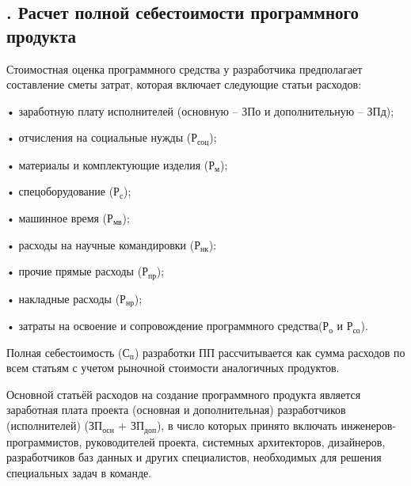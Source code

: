 \subtitlespace

\subsection*{ 
	\gostTitleFont
	\redline
	\thechaptercntr .\thesubchaptercntr \spc
	Расчет полной себестоимости программного продукта
} \addtocounter{subchaptercntr}{1}

\subtitlespace

{\gostFont
	
	\par \redline Стоимостная оценка программного средства у разработчика предполагает составление сметы затрат, которая включает следующие статьи расходов:
	
	\par \redline • заработную плату исполнителей (основную {--} ЗПо и дополнительную {--} ЗПд);
	\par \redline •	отчисления на социальные нужды ($\textrm{Р}_{\textrm{соц}}$);
	\par \redline •	материалы и комплектующие изделия ($\textrm{Р}_{\textrm{м}}$);
	\par \redline •	спецоборудование ($\textrm{Р}_{\textrm{с}}$);
	\par \redline •	машинное время ($\textrm{Р}_{\textrm{мв}}$);
	\par \redline •	расходы на научные командировки ($\textrm{Р}_{\textrm{нк}}$):
	\par \redline •	прочие прямые расходы ($\textrm{Р}_{\textrm{пр}}$);
	\par \redline •	накладные расходы ($\textrm{Р}_{\textrm{нр}}$);
	\par \redline •	затраты на освоение и сопровождение программного средства($\textrm{Р}_{\textrm{о}}$ и $\textrm{Р}_{\textrm{со}}$).
	
	\par \redline Полная себестоимость ($\textrm{С}_{\textrm{п}}$) разработки ПП рассчитывается как сумма расходов по всем статьям с учетом рыночной стоимости аналогичных продуктов.
	
	\par \redline Основной статьёй расходов на создание программного продукта является заработная плата проекта (основная и дополнительная) разработчиков (исполнителей) ($\textrm{ЗП}_{\textrm{осн}}$ + $\textrm{ЗП}_{\textrm{доп}}$), в число которых принято включать инженеров-программистов, руководителей проекта, системных архитекторов, дизайнеров, разработчиков баз данных и  других специалистов, необходимых для решения специальных задач в команде.
	 
}
